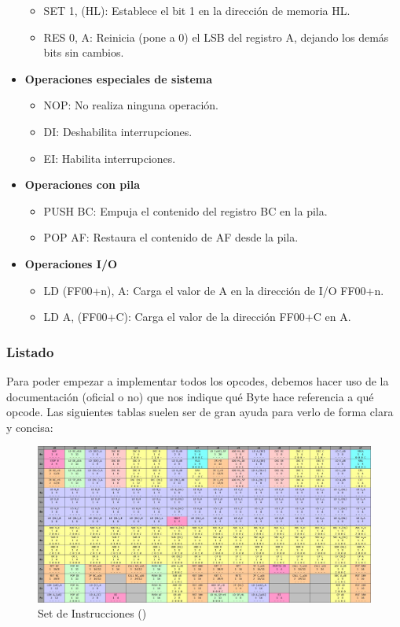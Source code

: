 \begin{itemize}
\begin{itemize}
  \item SET 1, (HL): Establece el bit 1 en la dirección de memoria HL.
  \item RES 0, A: Reinicia (pone a 0) el LSB del registro A, dejando los demás bits sin cambios.
  \end{itemize}
  \item \textbf{Operaciones especiales de sistema}
  \begin{itemize}
  \item NOP: No realiza ninguna operación.
  \item DI: Deshabilita interrupciones.
  \item EI: Habilita interrupciones.
  \end{itemize}
  \item \textbf{Operaciones con pila}
  \begin{itemize}
  \item PUSH BC: Empuja el contenido del registro BC en la pila.
  \item POP AF: Restaura el contenido de AF desde la pila.
  \end{itemize}
  \item \textbf{Operaciones I/O}
  \begin{itemize}
  \item LD (FF00+n), A: Carga el valor de A en la dirección de I/O FF00+n.
  \item LD A, (FF00+C): Carga el valor de la dirección FF00+C en A.
  \end{itemize}
\end{itemize}

\subsubsection{Listado}
Para poder empezar a implementar todos los opcodes, debemos hacer uso de la documentación (oficial o no) que nos indique qué Byte hace referencia a qué opcode. Las siguientes tablas suelen ser de gran ayuda para verlo de forma clara y concisa:

\begin{figure}[H]
\centering
\includegraphics[width=1\textwidth]{include/images/opcodes_1.jpg}
\caption{Set de Instrucciones (\cite{opcodes})}
\label{figure:opcodes_1}
\end{figure}

